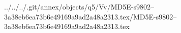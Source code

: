 ../../../.git/annex/objects/q5/Vv/MD5E-s9802--3a38eb6ea73b6e49169a9ad2a48a2313.tex/MD5E-s9802--3a38eb6ea73b6e49169a9ad2a48a2313.tex